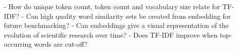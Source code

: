 \documentclass[../../Thesis.tex]{subfiles}
\begin{document}
- How do unique token count, token count and vocabulary size relate for TF-IDF?
- Can high quality word similarity sets be created from embedding for future benchmarking?
- Can embeddings give a visual representation of the evolution of scientific research over time?
- Does TF-IDF improve when top-occurring words are cut-off?
\end{document}
